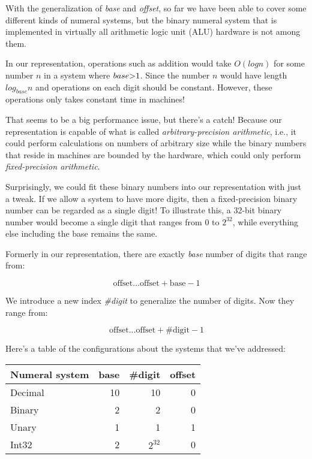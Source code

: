 \documentclass[12pt, a4paper]{article}
\begin{document}
With the generalization of \textit{base} and \textit{offset}, so far we have been
able to cover some different kinds of numeral systems, but the binary numeral
system that is implemented in virtually all arithmetic logic unit (ALU) hardware
is not among them.

In our representation, operations such as addition would take $ O(log{}n)$ for some
number $ n $ in a system where $ base \text{\textgreater} 1 $. Since the number $ n $
would have length $ log_{base} n $ and operations on each digit should be constant.
However, these operations only takes constant time in machines!

That seems to be a big performance issue, but there's a catch! Because our
representation is capable of what is called \textit{arbitrary-precision arithmetic},
i.e., it could perform calculations on numbers of arbitrary size while the binary
numbers that reside in machines are bounded by the hardware, which could only
perform \textit{fixed-precision arithmetic}.

Surprisingly, we could fit these binary numbers into our representation with
just a tweak. If we allow a system to have more digits, then a fixed-precision
binary number can be regarded as a single digit! To illustrate this, a 32-bit
binary number would become a single digit that ranges from $ 0 $ to $ 2^{32} $,
while everything else including the base remains the same.

Formerly in our representation, there are exactly \textit{base} number of digits
that range from:

$$
    \text{offset}  ...  \text{offset} + \text{base} - 1
$$

We introduce a new index \textit{\#digit} to generalize the number of digits.
Now they range from:

$$
    \text{offset}  ...  \text{offset} + \text{\#digit} - 1
$$

Here's a table of the configurations about the systems that we've addressed:

\begin{center}
    \begin{tabular}{l*{3}{r}}
    Numeral system      & base  & \#digit    & offset    \\
    \hline
    Decimal             & 10    & 10        & 0         \\
    Binary              & 2     & 2         & 0         \\
    Unary               & 1     & 1         & 1         \\
    Int32               & 2     & $ 2^{32} $ & 0        \\
    \end{tabular}
\end{center}
\end{document}

